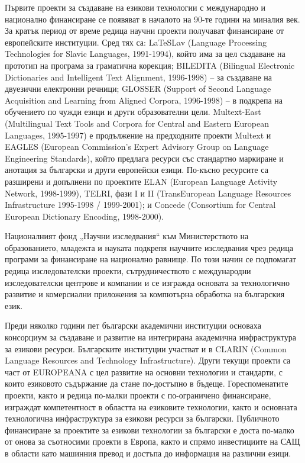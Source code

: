 \begin{multicols}{2}
Първите проекти за създаване на езикови
 технологии с международно и национално финансиране
 се появяват в началото на 90-те години на миналия
 век. За кратък период от време редица научни проекти
 получават финансиране от европейските институции.
 Сред тях са: LaTeSLav (Language Processing Technologies for Slavic Languages, 1991-1994), който има за цел
 създаване на прототип на програма за граматична
 корекция; BILEDITA (Bilingual Electronic Dictionaries and Intelligent Text Alignment, 1996-1998) – за създаване на
 двуезични електронни речници; GLOSSER (Support of Second Language Acquisition and Learning from Aligned Corpora, 1996-1998)
 – в подкрепа на обучението по чужди езици и други
 образователни цели. Multext-East (Multilingual Text Tools and Corpora for Central and Eastern European Languages, 1995-1997) е
 продължение на предходните проекти Multext и EAGLES (European Commission's Expert Advisory Group on Language Engineering Standards), който предлага ресурси със стандартно маркиране
 и анотация за български
и други европейски езици. По-късно ресурсите са разширени и допълнени по проектите ELAN (European Languagе Activity Network, 1998-1999), TELRI, фази I и II (TransEuropean Language Resources Infrastructure 1995-1998 /
1999-2001); и Concede (Consortium for Central European
 Dictionary Encoding, 1998-2000).

Националният фонд „Научни изследвания“ към Министерството на образованието, младежта и науката
 подкрепя научните изследвания чрез редица програми
 за финансиране на национално равнище. По този начин се подпомагат редица изследователски проекти, сътрудничеството с международни изследователски
 центрове и компании и се изгражда основата
 за технологично развитие и комерсиални приложения за
компютърна обработка на българския език.

Преди няколко години пет български академични институции основаха консорциум за създаване и развитие на интегрирана академична инфраструктура за
 езикови ресурси. Българските институции участват и в
 CLARIN  (Common Language Resources and Technology Infrastructure). Други текущи проекти са част от EUROPEANA с
 цел развитие на основни технологии и стандарти, с които
езиковото съдържание да стане по-достъпно в бъдеще.
 Гореспоменатите проекти, както и редица по-малки
 проекти с по-ограничено финансиране, изграждат
 компетентност в областта на езиковите технологии,
 както и основната технологична инфраструктура за
 езикови ресурси за български. Публичното финансиране
 за проектите за езикови технологии за български е доста
 по-малко от онова за съотносими проекти в Европа, както
 и спрямо инвестициите на САЩ \cite{sprachtech} в области като машинния превод и достъпа до информация на различни езици.




\end{multicols}
